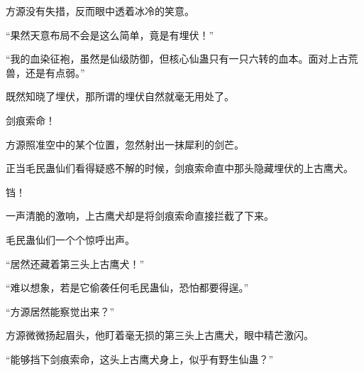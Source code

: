 \begin{this_body}
方源没有失措，反而眼中透着冰冷的笑意。

“果然天意布局不会是这么简单，竟是有埋伏！”

“我的血染征袍，虽然是仙级防御，但核心仙蛊只有一只六转的血本。面对上古荒兽，还是有点弱。”

既然知晓了埋伏，那所谓的埋伏自然就毫无用处了。

剑痕索命！

方源照准空中的某个位置，忽然射出一抹犀利的剑芒。

正当毛民蛊仙们看得疑惑不解的时候，剑痕索命直中那头隐藏埋伏的上古鹰犬。

铛！

一声清脆的激响，上古鹰犬却是将剑痕索命直接拦截了下来。

毛民蛊仙们一个个惊呼出声。

“居然还藏着第三头上古鹰犬！”

“难以想象，若是它偷袭任何毛民蛊仙，恐怕都要得逞。”

“方源居然能察觉出来？”

方源微微扬起眉头，他盯着毫无损的第三头上古鹰犬，眼中精芒激闪。

“能够挡下剑痕索命，这头上古鹰犬身上，似乎有野生仙蛊？”

\end{this_body}


